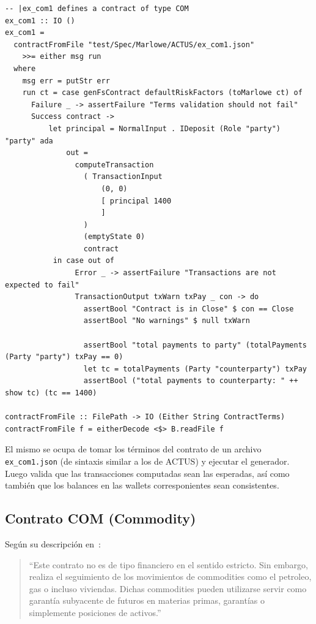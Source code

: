 \documentclass[12pt]{book}
\begin{document}
\begin{lstlisting}[style=Haskell-cardano, caption=Test de ejemplo escrito durante el desarrollo de la tesis para el contrato COM.]
-- |ex_com1 defines a contract of type COM
ex_com1 :: IO ()
ex_com1 =
  contractFromFile "test/Spec/Marlowe/ACTUS/ex_com1.json"
    >>= either msg run
  where
    msg err = putStr err
    run ct = case genFsContract defaultRiskFactors (toMarlowe ct) of
      Failure _ -> assertFailure "Terms validation should not fail"
      Success contract ->
          let principal = NormalInput . IDeposit (Role "party") "party" ada
              out =
                computeTransaction
                  ( TransactionInput
                      (0, 0)
                      [ principal 1400
                      ]
                  )
                  (emptyState 0)
                  contract
           in case out of
                Error _ -> assertFailure "Transactions are not expected to fail"
                TransactionOutput txWarn txPay _ con -> do
                  assertBool "Contract is in Close" $ con == Close
                  assertBool "No warnings" $ null txWarn

                  assertBool "total payments to party" (totalPayments (Party "party") txPay == 0)
                  let tc = totalPayments (Party "counterparty") txPay
                  assertBool ("total payments to counterparty: " ++ show tc) (tc == 1400)

contractFromFile :: FilePath -> IO (Either String ContractTerms)
contractFromFile f = eitherDecode <$> B.readFile f
\end{lstlisting}

El mismo se ocupa de tomar los términos del contrato de un archivo \texttt{ex\_com1.json} (de sintaxis similar a los de ACTUS) y ejecutar el generador. Luego valida que las transacciones computadas sean las esperadas, así como también que los balances en las wallets corresponientes sean consistentes.

\subsection{Contrato COM (Commodity)}

Según su descripción en~\cite{ACTUS_Dictionary}:

\begin{quote} 
``Este contrato no es de tipo financiero en el sentido estricto. Sin embargo, realiza el seguimiento de los movimientos de commodities como el petroleo, gas o incluso viviendas. Dichas commodities pueden utilizarse servir como garantía subyacente de futuros en materias primas, garantías o simplemente posiciones de activos.''
\end{quote}
\end{document}
